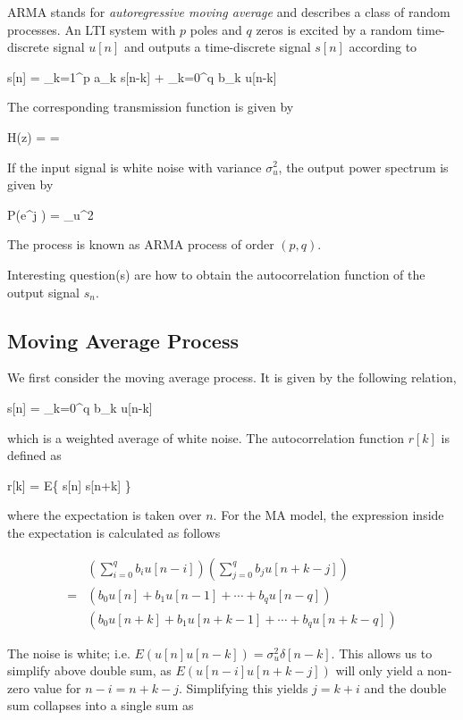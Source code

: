 
ARMA stands for \emph{autoregressive moving average} and describes a class of random processes. An LTI system with $p$ poles and $q$ zeros is excited by a random time-discrete signal $u[n]$ and outputs a time-discrete signal $s[n]$ according to

\bee
s[n] = \sum_{k=1}^p a_k s[n-k] + \sum_{k=0}^q b_k u[n-k]
\eee

The corresponding transmission function is given by

\bee
H(z) =  = 
\eee

If the input signal is white noise with variance $\sigma_u^2$, the output power spectrum is given by

\bee
P(e^{j \omega}) = \sigma_u^2 
\eee

The process is known as ARMA process of order $(p,q)$.


Interesting question(s) are how to obtain the autocorrelation function of the output signal $s_n$.


\subsection{Moving Average Process}

We first consider the moving average process. It is given by the following relation,

\bee
s[n] = \sum_{k=0}^q b_k u[n-k]
\eee


which is a weighted average of white noise. The autocorrelation function $r[k]$ is defined as 

\bee
r[k] = E\left\{ s[n] s[n+k] \right\}
\eee

where the expectation is taken over $n$. For the MA model, the expression inside the expectation is calculated as follows

\begin{align*}
&\left(\sum_{i=0}^q b_i u[n-i] \right) \left( \sum_{j=0}^q b_j u[n+k-j] \right) \\
= &\left( b_0 u[n] + b_1 u[n-1] + \cdots + b_q u[n-q] \right) \\
  &\left( b_0 u[n+k] + b_1 u[n+k-1] + \cdots + b_q u[n+k-q] \right)
\end{align*}

The noise is white; i.e. $E(u[n] u[n-k]) = \sigma_u^2 \delta[n-k]$. This allows us to simplify above double sum, as $E(u[n-i]u[n+k-j])$ will only yield a non-zero value for $n-i = n+k-j$. Simplifying this yields $j = k+i$ and the double sum collapses into a single sum as

